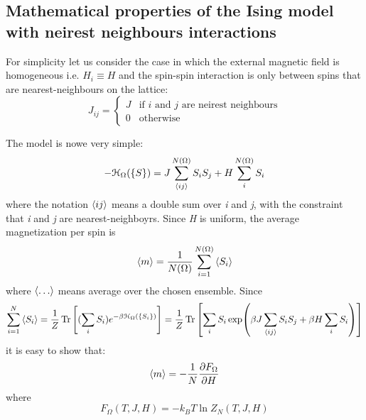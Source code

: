 \documentclass[../main/main.tex]{subfiles}
\begin{document}
\subsection{Mathematical properties of the Ising model with neirest neighbours interactions}
For simplicity let us consider the case in which the external magnetic field is homogeneous i.e. \( H_i \equiv H \) and the spin-spin interaction is only between spins that are nearest-neighbours on the lattice:
\begin{equation}
J_{ij} =
  \begin{cases}
  J & \text{if } i \text{ and } j \text{ are neirest neighbours} \\
  0 & \text{otherwise}
  \end{cases}
\end{equation}

The model is nowe very simple:
\begin{equation}
  - \mathcal{H}_ \Omega ( \{ S \}  ) = J \sum_{\expval{ij} }^{N (\Omega )} S_i S_j + H \sum_{i}^{N(\Omega )} S_i
\end{equation}
where the notation \( \expval{ij}  \) means a double sum over \emph{i} and \emph{j}, with the constraint that \emph{i} and \emph{j} are nearest-neighboyrs.
Since \emph{H} is uniform, the average magnetization per spin is
\begin{equation}
  \expval{m} = \frac{1}{N (\Omega )} \sum_{i=1}^{N (\Omega )} \expval{S_i}
\end{equation}
where \( \expval{\dots}  \)  means average over the chosen ensemble.
Since
\begin{equation}
  \sum_{i=1}^{N} \expval{S_i} = \frac{1}{Z} \Tr \qty[(\sum_{i}^{} S_i ) e^{-\beta \mathcal{H}_ \Omega (\{ S_i \}  )} ]  = \frac{1}{Z} \Tr \qty[\sum_{i}^{} S_i \exp (\beta  J \sum_{\expval{ij} }^{} S_i S_j + \beta H \sum_{i}^{} S_i  )  ]
\end{equation}
it is easy to show that:
\begin{equation}
  \expval{m} = - \frac{1}{N} \pdv{F_ \Omega }{H}
\end{equation}
where
\begin{equation}
  F_ \Omega (T,J,H) = - k_B T \ln{Z_N (T,J,H)}
\end{equation}
\end{document}
